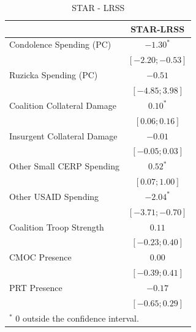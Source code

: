 \documentclass[12pt]{article}
\begin{document}
\begin{table}[!h]
\begin{center}
\begin{footnotesize}
\caption{STAR - LRSS}
\label{table:star_reduced}
\begin{tabular}{l c}
\toprule
 & STAR-LRSS \\
\midrule
Condolence Spending (PC)    & $-1.30^{*}$       \\
                            & $ [-2.20; -0.53]$ \\
Ruzicka Spending (PC)       & $-0.51$           \\
                            & $ [-4.85;  3.98]$ \\
Coalition Collateral Damage & $0.10^{*}$        \\
                            & $ [ 0.06;  0.16]$ \\
Insurgent Collateral Damage & $-0.01$           \\
                            & $ [-0.05;  0.03]$ \\
Other Small CERP Spending   & $0.52^{*}$        \\
                            & $ [ 0.07;  1.00]$ \\
Other USAID Spending        & $-2.04^{*}$       \\
                            & $ [-3.71; -0.70]$ \\
Coalition Troop Strength    & $0.11$            \\
                            & $ [-0.23;  0.40]$ \\
CMOC Presence               & $0.00$            \\
                            & $ [-0.39;  0.41]$ \\
PRT Presence                & $-0.17$           \\
                            & $ [-0.65;  0.29]$ \\
\bottomrule
\multicolumn{2}{l}{\tiny{$^*$ 0 outside the confidence interval.}}
\end{tabular}
\end{footnotesize}
\end{center}
\end{table}
\end{document}
